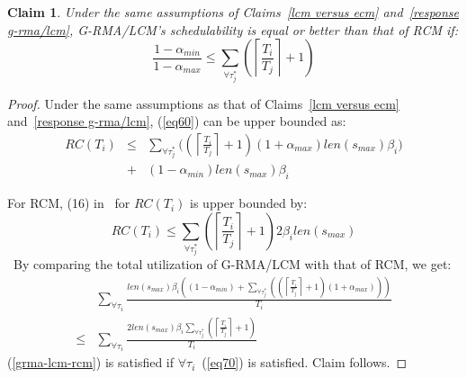 \documentclass[conference]{IEEEtran}
\newtheorem{clm}{Claim}
\begin{document}
\begin{clm}
Under the same assumptions of Claims~\ref{lcm versus ecm} and~\ref{response g-rma/lcm}, G-RMA/LCM's schedulability is equal or better than that of RCM if:
\begin{equation}
\frac{1-\alpha_{min}}{1-\alpha_{max}}\le \sum_{\forall \tau_j^*}\left( \left\lceil\frac{T_i}{T_j}\right\rceil +1 \right)
\label{eq70}\end{equation}
\end{clm}
%
\begin{proof}
Under the same assumptions as that of Claims~\ref{lcm versus ecm} and~\ref{response g-rma/lcm}, (\ref{eq60}) can be upper bounded as:
\begin{eqnarray}
RC(T_i) & \le & \sum_{\forall \tau_{j}^{*}}\bigg(\left(\left\lceil\frac{T_{i}}{T_{j}}\right\rceil +1\right)(1+\alpha_{max})
 len(s_{max})\beta_{i}\bigg)\nonumber\\
 & + & (1-\alpha_{min})len(s_{max})\beta_{i}\label{eq68}\end{eqnarray}
 
For RCM, (16) in~\cite{stmconcurrencycontrol:emsoft11} for $RC(T_{i})$ is upper bounded by:
\begin{equation*}
RC(T_{i})\le\sum_{\forall \tau_{j}^{*}}\left(\left\lceil\frac{T_{i}}{T_{j}}\right\rceil +1\right)2\beta_{i}len(s_{max})\label{eq69}\end{equation*}\
By comparing the total utilization of G-RMA/LCM with that of RCM,
we get:
\begin{eqnarray}
 & \sum_{\forall\tau_{i}}\frac{len\left(s_{max}\right)\beta_{i}\left(\left(1-\alpha_{min}\right)+\sum_{\forall\tau_{j}^{*}}\left(\left(\left\lceil\frac{T_{i}}{T_{j}}\right\rceil+1\right)\left(1+\alpha_{max}\right)\right)\right)}{T_{i}}\nonumber\\
\le & \sum_{\forall\tau_{i}}\frac{2len\left(s_{max}\right)\beta_{i}\sum_{\forall\tau_{j}^{*}}\left(\left\lceil\frac{T_{i}}{T_{j}}\right\rceil+1\right)}{T_{i}}\label{grma-lcm-rcm}\end{eqnarray}
(\ref{grma-lcm-rcm}) is satisfied if $\forall \tau_i$~(\ref{eq70}) is satisfied. Claim follows.
\end{proof}
\end{document}
